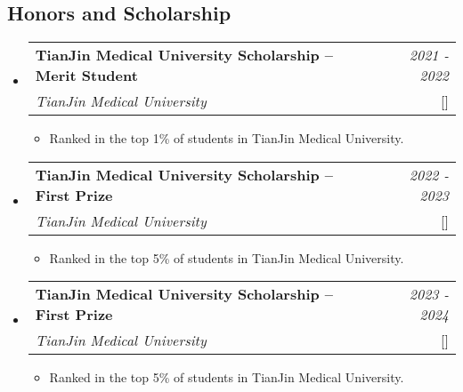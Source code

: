\documentclass[a4paper,11pt]{article}
\makeatletter
\newcommand{\resumeProject}[4]{
\vspace{0.5mm}\item
    \begin{tabular*}{0.98\textwidth}[t]{l@{\extracolsep{\fill}}r}
        \textbf{#1} & \textit{\footnotesize{#3}} \\
        \footnotesize{\textit{#2}} & \footnotesize{#4}
    \end{tabular*}
    \vspace{-2.4mm}
}
\newcommand{\resumeSubHeadingListStart}{\begin{itemize}[leftmargin=*,labelsep=1mm]}
\newcommand{\resumeItemListStart}{\begin{itemize}[leftmargin=*,labelsep=1mm,itemsep=0.5mm]}
\newcommand{\resumeSubHeadingListEnd}{\end{itemize}\vspace{2mm}}
\newcommand{\resumeItemListEnd}{\end{itemize}\vspace{-2mm}}
\makeatother
\begin{document}
\begin{justify}
\section{\textbf{Honors and Scholarship}}
\vspace{-0.4mm}
\resumeSubHeadingListStart

\resumeProject
  {TianJin Medical University Scholarship -- Merit Student}
  {TianJin Medical University}
  {2021 - 2022}
  {{}[\href{https://github.com/wunaiwuhuang/materials/tree/main/Award\_and\_honour\%E8\%8E\%B7\%E5\%A5\%96\%E8\%AF\%81\%E6\%98\%8E/scholarship}{\textcolor{darkblue}{\faIcon{globe}}}]}
\resumeItemListStart
  \item Ranked in the top 1\% of students in TianJin Medical University.
\resumeItemListEnd

\resumeProject
  {TianJin Medical University Scholarship -- First Prize}
  {TianJin Medical University}
  {2022 - 2023}
  {{}[\href{https://github.com/wunaiwuhuang/materials/tree/main/Award\_and\_honour\%E8\%8E\%B7\%E5\%A5\%96\%E8\%AF\%81\%E6\%98\%8E/scholarship}{\textcolor{darkblue}{\faIcon{globe}}}]}
\resumeItemListStart
  \item Ranked in the top 5\% of students in TianJin Medical University.
\resumeItemListEnd

\resumeProject
  {TianJin Medical University Scholarship -- First Prize}
  {TianJin Medical University}
  {2023 - 2024}
  {{}[\href{https://github.com/wunaiwuhuang/materials/tree/main/Award\_and\_honour\%E8\%8E\%B7\%E5\%A5\%96\%E8\%AF\%81\%E6\%98\%8E/scholarship}{\textcolor{darkblue}{\faIcon{globe}}}]}
\resumeItemListStart
  \item Ranked in the top 5\% of students in TianJin Medical University.
\resumeItemListEnd

\resumeSubHeadingListEnd

\vspace{-6mm}

\end{justify}
\end{document}
